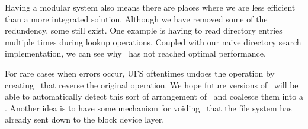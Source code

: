 Having a modular system also means there are places where we are less
efficient than a more integrated solution. Although we have removed some
of the redundency, some still exist. One example is having to read directory
entries multiple times during lookup operations. Coupled with our naive
directory search implementation, we can see why \Kudos\ has not reached
optimal performance.

For rare cases when errors occur, UFS oftentimes undoes the operation by
creating \chdescs\ that reverse the original operation. We hope future
versions of \Kudos\ will be able to automatically detect this sort of
arrangement of \chdescs\ and coalesce them into a \noop. Another idea is to
have some mechanism for voiding \chdescs\ that the file system has already
sent down to the block device layer.
